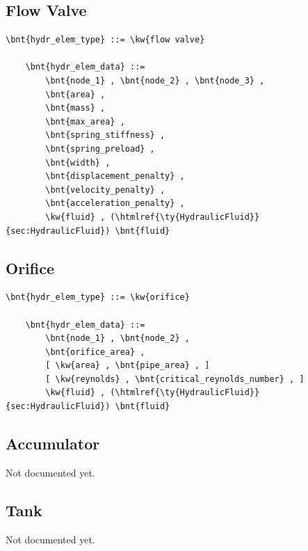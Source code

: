 \subsection{Flow Valve}
\label{sec:EL:HYDR:FLOW_VALVE}
\begin{Verbatim}[commandchars=\\\{\}]
    \bnt{hydr_elem_type} ::= \kw{flow valve}

    \bnt{hydr_elem_data} ::=
        \bnt{node_1} , \bnt{node_2} , \bnt{node_3} ,
        \bnt{area} ,
        \bnt{mass} ,
        \bnt{max_area} ,
        \bnt{spring_stiffness} ,
        \bnt{spring_preload} ,
        \bnt{width} ,
        \bnt{displacement_penalty} ,
        \bnt{velocity_penalty} ,
        \bnt{acceleration_penalty} ,
        \kw{fluid} , (\htmlref{\ty{HydraulicFluid}}{sec:HydraulicFluid}) \bnt{fluid}
\end{Verbatim}



\subsection{Orifice}
\label{sec:EL:HYDR:ORIFICE}
\begin{Verbatim}[commandchars=\\\{\}]
    \bnt{hydr_elem_type} ::= \kw{orifice}

    \bnt{hydr_elem_data} ::=
        \bnt{node_1} , \bnt{node_2} ,
        \bnt{orifice_area} ,
        [ \kw{area} , \bnt{pipe_area} , ]
        [ \kw{reynolds} , \bnt{critical_reynolds_number} , ]
        \kw{fluid} , (\htmlref{\ty{HydraulicFluid}}{sec:HydraulicFluid}) \bnt{fluid}
\end{Verbatim}



\subsection{Accumulator}
\label{sec:EL:HYDR:ACCUMULATOR}
Not documented yet.



\subsection{Tank}
\label{sec:EL:HYDR:TANK}
Not documented yet.



